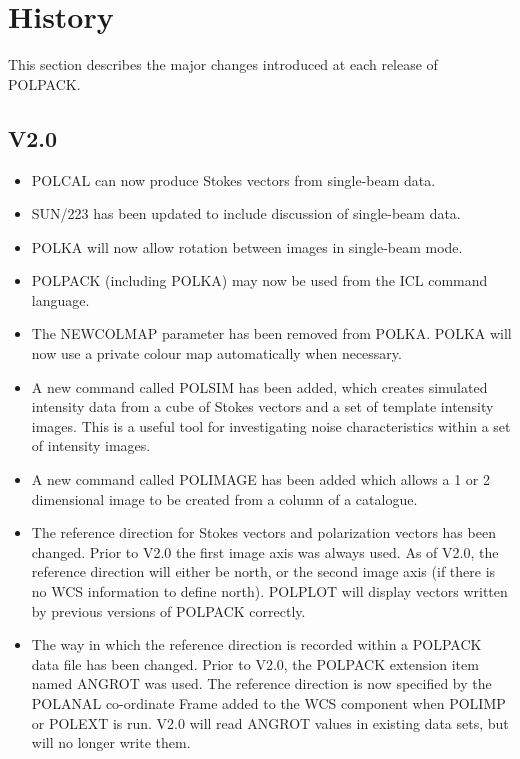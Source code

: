\documentclass[twoside,11pt]{article}
\newcommand{\htmlref}[2]{#1}
\renewcommand{\_}{\texttt{\symbol{95}}}
\begin{document}
\section{\label{APP:HISTORY}History}
This section describes the major changes introduced at each release of
POLPACK.
\subsection{V2.0}

\begin{itemize}

\item \htmlref{POLCAL}{POLCAL} can now produce Stokes vectors from
single-beam data.

\item SUN/223 has been updated to include discussion of single-beam data.

\item \htmlref{POLKA}{POLKA} will now allow rotation between images in
single-beam mode.

\item POLPACK (including \htmlref{POLKA}{POLKA}) may now be used from the
ICL command language.

\item The NEWCOLMAP parameter has been removed from \htmlref{POLKA}{POLKA}.
POLKA will now use a private colour map automatically when necessary.

\item A new command called \htmlref{POLSIM}{POLSIM} has been added, which
creates simulated intensity data from a cube of Stokes vectors and a set
of template intensity images. This is a useful tool for investigating
noise characteristics within a set of intensity images.

\item A new command called \htmlref{POLIMAGE}{POLIMAGE} has been added
which allows a 1 or 2 dimensional image to be created from a column of a 
catalogue. 

\item The reference direction for Stokes vectors and polarization vectors
has been changed. Prior to V2.0 the first image axis was always used. As
of V2.0, the reference direction will either be north, or the second
image axis (if there is no WCS information to define north).
\htmlref{POLPLOT}{POLPLOT} will display vectors written by previous
versions of POLPACK correctly. 

\item The way in which the reference direction is recorded within a
POLPACK data file has been changed. Prior to V2.0, the POLPACK extension 
item named ANGROT was used. The reference direction is now specified by 
the POLANAL co-ordinate Frame added to the WCS component when POLIMP or 
POLEXT is run. V2.0 will read ANGROT values in existing data sets, but 
will no longer write them.


\end{itemize}
\end{document}
